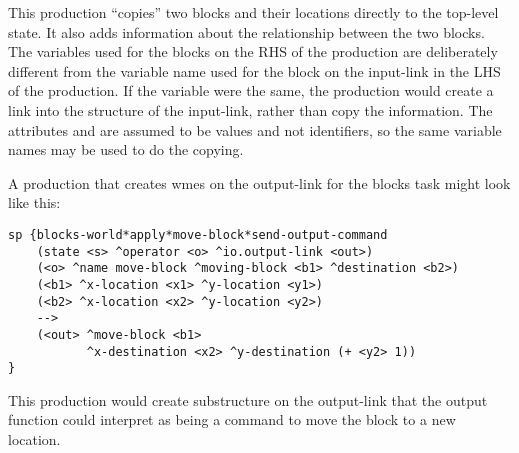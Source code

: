 This production ``copies'' two blocks and their locations directly to 
the top-level state. 
It also adds information about the
relationship between the two blocks.  The variables used
for the blocks on the RHS of the production are deliberately different from the
variable name used for the block on the input-link in the LHS of the
production. If the variable were the same, the production would create 
a link into the structure of the input-link, rather than copy the information.
The attributes  and
 are assumed to be values and not identifiers, so the same
variable names may be used to do the copying.


A production that creates wmes on the output-link for the blocks task 
might look like this:

\begin{verbatim}
sp {blocks-world*apply*move-block*send-output-command
    (state <s> ^operator <o> ^io.output-link <out>)
    (<o> ^name move-block ^moving-block <b1> ^destination <b2>)
    (<b1> ^x-location <x1> ^y-location <y1>)
    (<b2> ^x-location <x2> ^y-location <y2>)
    -->
    (<out> ^move-block <b1>
           ^x-destination <x2> ^y-destination (+ <y2> 1))
}
\end{verbatim} \vspace{12pt}

This production would create substructure on the output-link that 
the output function could interpret as being a command to 
move the block to a new location.


